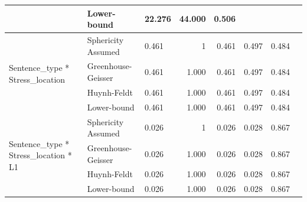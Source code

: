 \documentclass[a4paper]{article}
\begin{document}
\begin{table}[H]
\begin{center}
\begin{tabular}{p{}p{}|l|r|r|r|r|r|}
\cline{2-7}
                                                        & Lower-bound        & 22.276                                       & 44.000                  & 0.506                            & \multicolumn{1}{l|}{~} & \multicolumn{1}{l|}{~}     \\ 
\hline
\multirow{4}{*}{Sentence\_type * Stress\_location}      & Sphericity Assumed & 0.461                                        & 1                       & 0.461                            & 0.497                  & 0.484                      \\ 
\cline{2-7}
                                                        & Greenhouse-Geisser & 0.461                                        & 1.000                   & 0.461                            & 0.497                  & 0.484                      \\ 
\cline{2-7}
                                                        & Huynh-Feldt        & 0.461                                        & 1.000                   & 0.461                            & 0.497                  & 0.484                      \\ 
\cline{2-7}
                                                        & Lower-bound        & 0.461                                        & 1.000                   & 0.461                            & 0.497                  & 0.484                      \\ 
\hline
\multirow{4}{*}{Sentence\_type * Stress\_location * L1} & Sphericity Assumed & 0.026                                        & 1                       & 0.026                            & 0.028                  & 0.867                      \\ 
\cline{2-7}
                                                        & Greenhouse-Geisser & 0.026                                        & 1.000                   & 0.026                            & 0.028                  & 0.867                      \\ 
\cline{2-7}
                                                        & Huynh-Feldt        & 0.026                                        & 1.000                   & 0.026                            & 0.028                  & 0.867                      \\ 
\cline{2-7}
                                                        & Lower-bound        & 0.026                                        & 1.000                   & 0.026                            & 0.028                  & 0.867                      \\ 

\end{tabular}
\end{center}
\end{table}
\end{document}
